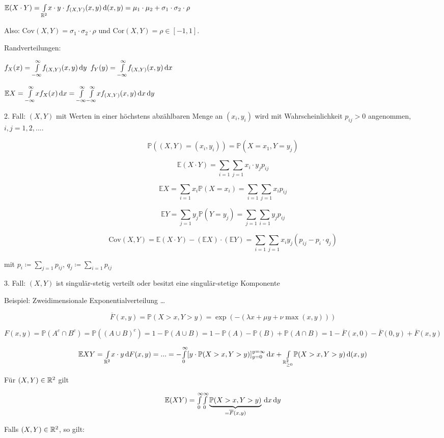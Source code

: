 \documentclass{cheat-sheet}
\renewcommand{\P}{\mathbb{P}} %
\newcommand{\E}{\mathbb{E}} %
\newcommand{\Cov}{\mathrm{Cov}} %
\newcommand{\cor}{\mathrm{Cor}} %
\begin{document}
$\E (X \cdot Y) = \Int{\R^2}{}{x \cdot y \cdot f_{(X,Y)}(x,y)}{(x, y)} = \mu_1 \cdot \mu_2 + \sigma_1 \cdot \sigma_2 \cdot \rho$

Also: $\Cov(X, Y) = \sigma_1 \cdot \sigma_2 \cdot \rho$ und $\cor(X, Y) = \rho \in [-1, 1]$.

Randverteilungen:

$f_X(x) = {\textstyle \int\limits_{-\infty}^{\infty}} f_{(X,Y)}(x,y) \,\mathrm{d} y$
$f_Y(y) = {\textstyle \int\limits_{-\infty}^{\infty}} f_{(X,Y)}(x,y) \,\mathrm{d} x$

$\E X = \Int{-\infty}{\infty}{x f_X(x)}{x} = \Int{-\infty}{\infty}{\Int{-\infty}{\infty}{x f_{(X,Y)}(x,y)}{x}}{y}$

2. Fall: $(X, Y)$ mit Werten in einer höchstens abzählbaren Menge an $(x_i, y_i)$ wird mit Wahrscheinlichkeit $p_{ij} > 0$ angenommen, $i, j = 1, 2, ...$.

\[ \P((X, Y) = (x_i, y_i)) = \P(X=x_1, Y=y_j) \]

\[ \E(X \cdot Y) = \sum_{i=1} \sum_{j=1} x_i \cdot y_j p_{ij} \]

\[ \E X = \sum_{i=1} x_i \P(X = x_i) = \sum_{i=1} \sum_{j=1} x_i p_{ij} \]

\[ \E Y = \sum_{j=1} y_j \P(Y = y_j) = \sum_{j=1} \sum_{i=1} y_j p_{ij} \]

\[ \Cov(X, Y) = \E (X \cdot Y) - (\E X) \cdot (\E Y) = \sum_{i=1} \sum_{j=1} x_i y_j (p_{ij} - p_i \cdot q_j) \]

mit $p_i \coloneqq \sum_{j=1} p_{ij}$, $q_j \coloneqq \sum_{i=1} p_{ij}$

3. Fall: $(X, Y)$ ist singulär-stetig verteilt oder besitzt eine singulär-stetige Komponente

Beispiel: Zweidimensionale Exponentialverteilung \ldots

\[ \overline{F}(x,y) = \P(X > x, Y > y) = \exp \left( -(\lambda x + \mu y + \nu \max(x,y)) \right) \]

\[ F(x, y) = \P(A^c \cap B^c) = \P((A \cup B)^c) = 1 - \P(A \cup B) = 1 - \P(A) - \P(B) + \P(A \cap B) = 1 - \overline{F}(x,0) - \overline{F}(0,y) + \overline{F}(x,y) \]

\[ \E XY = \Int{\R^2}{}{x \cdot y}{F(x,y)} = ... = - \Int{0}{\infty}{[y \cdot \P(X > x, Y > y)]_{y=0}^{y=\infty}}{x} + \Int{\R_{\geq 0}^2}{}{\P(X > x, Y > y)}{(x,y)} \]

Für $(X, Y) \in \mathbb{R}^2$ gilt

\[ \E (XY) = \Int{0}{\infty}{\Int{0}{\infty}{\underbrace{\P(X > x, Y > y)}_{= \overline{F}(x,y)}}{x}}{y} \]

Falls $(X, Y) \in \mathbb{R}^2$, so gilt:
\end{document}
